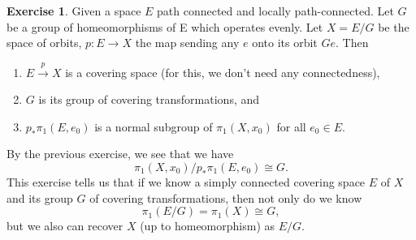 \documentclass[12pt]{article}
\theoremstyle{definition}
\numberwithin{thm}{section}
\newtheorem{exe}[thm]{Exercise}
\begin{document}
\begin{exe} \label{exe:quotientcoveringpspace}
	Given a space $E$ path connected and locally path-connected. Let $G$ be a group of homeomorphisms of E which operates evenly. Let $X = E/G$ be the space of orbits, $p :E \to X$ the map sending any $e$ onto its orbit $Ge.$ Then 
	\begin{enumerate}
	 	\item $E \overset{p}{\longrightarrow} X$ is a covering space (for this, we don't need any connectedness), 
	 	\item $G$ is its group of covering transformations, and 
	 	\item $p_*\pi_1(E, e_0)$ is a normal subgroup of $\pi_1(X, x_0)$ for all $e_0 \in E.$ 
	\end{enumerate} 
	By the previous exercise, we see that we have
	\begin{equation*} 
		\pi_1(X, x_0)/p_*\pi_1(E, e_0) \cong G.
	\end{equation*}
	This exercise tells us that if we know a simply connected covering space $E$ of $X$ and its group $G$ of covering transformations, then not only do we know 
	\begin{equation*} 
		\pi_1(E/G) = \pi_1(X) \cong G,
	\end{equation*} but we also can recover $X$ (up to homeomorphism) as $E/G.$
\end{exe}
\end{document}
